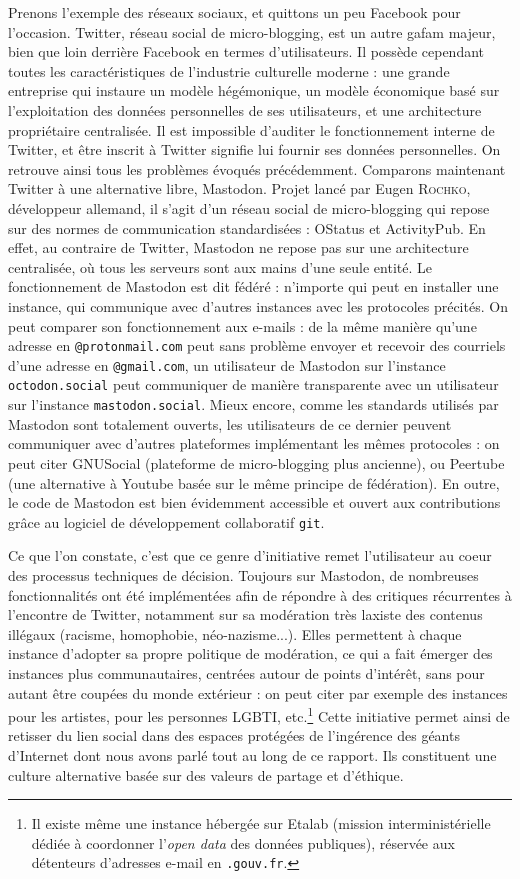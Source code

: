 \documentclass[a4paper,14pt]{extreport}
\begin{document}
Prenons l'exemple des réseaux sociaux, et quittons un peu Facebook pour l'occasion. Twitter, réseau social de micro-blogging, est un autre \gls{gafam} majeur, bien que loin derrière Facebook en termes d'utilisateurs. Il possède cependant toutes les caractéristiques de l'industrie culturelle moderne : une grande entreprise qui instaure un modèle hégémonique, un modèle économique basé sur l'exploitation des données personnelles de ses utilisateurs, et une architecture propriétaire centralisée. Il est impossible d'auditer le fonctionnement interne de Twitter, et être inscrit à Twitter signifie lui fournir ses données personnelles. On retrouve ainsi tous les problèmes évoqués précédemment. Comparons maintenant Twitter à une alternative libre, Mastodon. Projet lancé par Eugen \textsc{Rochko}, développeur allemand, il s'agit d'un réseau social de micro-blogging qui repose sur des normes de communication standardisées : OStatus et ActivityPub. En effet, au contraire de Twitter, Mastodon ne repose pas sur une architecture centralisée, où tous les serveurs sont aux mains d'une seule entité. Le fonctionnement de Mastodon est dit fédéré : n'importe qui peut en installer une instance, qui communique avec d'autres instances avec les protocoles précités. On peut comparer son fonctionnement aux e-mails : de la même manière qu'une adresse en \texttt{@protonmail.com} peut sans problème envoyer et recevoir des courriels d'une adresse en \texttt{@gmail.com}, un utilisateur de Mastodon sur l'instance \texttt{octodon.social} peut communiquer de manière transparente avec un utilisateur sur l'instance \texttt{mastodon.social}. Mieux encore, comme les standards utilisés par Mastodon sont totalement ouverts, les utilisateurs de ce dernier peuvent communiquer avec d'autres plateformes implémentant les mêmes protocoles : on peut citer GNUSocial (plateforme de micro-blogging plus ancienne), ou Peertube (une alternative à Youtube basée sur le même principe de fédération). En outre, le code de Mastodon est bien évidemment accessible et ouvert aux contributions grâce au logiciel de développement collaboratif \texttt{git}. 

Ce que l'on constate, c'est que ce genre d'initiative remet l'utilisateur au coeur des processus techniques de décision. Toujours sur Mastodon, de nombreuses fonctionnalités ont été implémentées afin de répondre à des critiques récurrentes à l'encontre de Twitter, notamment sur sa modération très laxiste des contenus illégaux (racisme, homophobie, néo-nazisme...). Elles permettent à chaque instance d'adopter sa propre politique de modération, ce qui a fait émerger des instances plus communautaires, centrées autour de points d'intérêt, sans pour autant être coupées du monde extérieur : on peut citer par exemple des instances pour les artistes, pour les personnes LGBTI, etc.\footnote{Il existe même une instance hébergée sur Etalab (mission interministérielle dédiée à coordonner l'\textit{open data} des données publiques), réservée aux détenteurs d'adresses e-mail en \texttt{.gouv.fr}.} Cette initiative permet ainsi de retisser du lien social dans des espaces protégées de l'ingérence des géants d'Internet dont nous avons parlé tout au long de ce rapport. Ils constituent une culture alternative basée sur des valeurs de partage et d'éthique.
\end{document}

